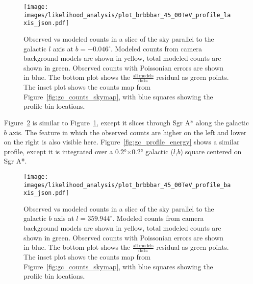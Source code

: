 \begin{figure}[t]
  \centering
  \texttt{[image: images/likelihood\_analysis/plot\_brbbbar\_45\_00TeV\_profile\_laxis\_json.pdf]}
  \caption[Galactic Center Profile vs Galactic $l$]{
    Observed vs modeled counts in a slice of the sky parallel to the galactic $l$ axis at $b=-0.046{}^{\circ}$.
    Modeled counts from camera background models are shown in yellow, total modeled counts are shown in green.
    Observed counts with Poissonian errors are shown in blue.
    The bottom plot shows the $\frac{\mathrm{all\:models}}{\mathrm{data}}$ residual as green points.
    The inset plot shows the counts map from Figure~\ref{fig:gc_counts_skymap}, with blue squares showing the profile bin locations.
  }
  \label{fig:gc_profile_gal_l}
\end{figure}

Figure~\ref{fig:gc_profile_gal_b} is similar to Figure~\ref{fig:gc_profile_gal_l}, except it slices through Sgr A* along the galactic $b$ axis.
The feature in which the observed counts are higher on the left and lower on the right is also visible here.
Figure~\ref{fig:gc_profile_energy} shows a similar profile, except it is integrated over a \ang{0.2}$\times$\ang{0.2} galactic ($l$,$b$) square centered on Sgr A*.

\begin{figure}[t]
  \centering
  \texttt{[image: images/likelihood\_analysis/plot\_brbbbar\_45\_00TeV\_profile\_baxis\_json.pdf]}
  \caption[Galactic Center Profile vs Galactic $b$]{
    Observed vs modeled counts in a slice of the sky parallel to the galactic $b$ axis at $l=359.944^{\circ}$.
    Modeled counts from camera background models are shown in yellow, total modeled counts are shown in green.
    Observed counts with Poissonian errors are shown in blue.
    The bottom plot shows the $\frac{\mathrm{all\:models}}{\mathrm{data}}$ residual as green points.
    The inset plot shows the counts map from Figure~\ref{fig:gc_counts_skymap}, with blue squares showing the profile bin locations.
  }
  \label{fig:gc_profile_gal_b}
\end{figure}


